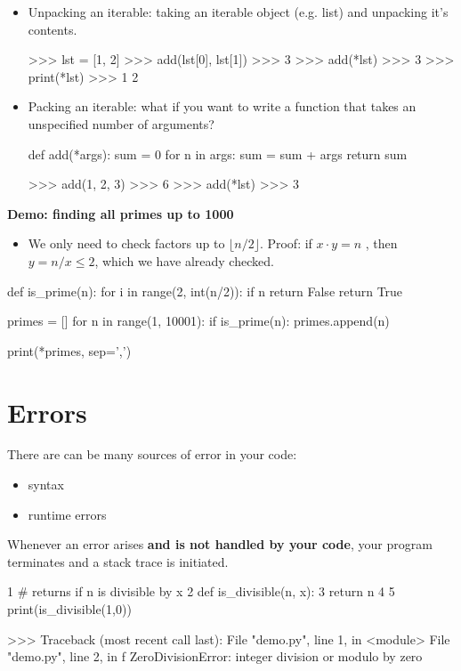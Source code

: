 \documentclass[12pt]{article}
\numberwithin{equation}{section}
\begin{document}
\begin{itemize}
    \item Unpacking an iterable: taking an iterable object (e.g. list) and unpacking it's contents.
    \begin{python}
    >>> lst = [1, 2]
    >>> add(lst[0], lst[1])
    >>> 3
    >>> add(*lst)
    >>> 3
    >>> print(*lst)
    >>> 1 2
    \end{python}
    \item Packing an iterable: what if you want to write a function that takes an unspecified number of arguments?
    \begin{python}
    def add(*args):
        sum = 0
        for n in args:
            sum = sum + args
        return sum
    
    >>> add(1, 2, 3)
    >>> 6
    >>> add(*lst)
    >>> 3
    \end{python}
\end{itemize}

\textbf{Demo: finding all primes up to 1000}
\begin{itemize}
    \item We only need to check factors up to $\lfloor n/2 \rfloor$. Proof: if $x\cdot y = n$ , then $y = n/x \leq 2$, which we have already checked.
\end{itemize}

\begin{python}
def is_prime(n):
    for i in range(2, int(n/2)):
        if n%
            return False
    return True

primes = []
for n in range(1, 10001):
    if is_prime(n):
        primes.append(n)

print(*primes, sep=',')
\end{python}

\section{Errors}
There are can be many sources of error in your code:
\begin{itemize}
    \item syntax
    \item runtime errors
\end{itemize}
Whenever an error arises \textbf{and is not handled by your code}, your program terminates and a stack trace is initiated.

\begin{python}
1 # returns if n is divisible by x
2 def is_divisible(n, x):
3 	return n%
4 
5 print(is_divisible(1,0))

>>> Traceback (most recent call last):
  File "demo.py", line 1, in <module>
  File "demo.py", line 2, in f
ZeroDivisionError: integer division or modulo by zero
\end{python}
\end{document}
